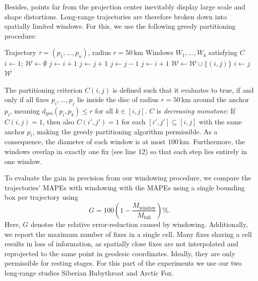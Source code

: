 Besides, points far from the projection center inevitably display large scale and shape distortions.
Long-range trajectories are therefore broken down into spatially limited windows.
For this, we use the following greedy partitioning procedure:
\begin{algorithm}[H]
\caption{Greedy-Partitioning with disc criterium}
\begin{algorithmic}[1]
\Require Trajectory $\tau = (p_1,\dots,p_n)$, radius $r = 50\,\mathrm{km}$
\Ensure Windows $W_1,\dots,W_k$ satisfying $C$ 
\State $i \gets 1$; \; $\mathcal{W} \gets \emptyset$
  \State $j \gets i + 1$
    \State $j \gets j + 1$
  \EndWhile
  \State $j \gets j - 1$
    \State $j \gets i + 1$
  \EndIf
  \State $\mathcal{W} \gets \mathcal{W} \cup \{(i,j)\}$
  \State $i \gets j$
\EndWhile
\State \Return $\mathcal{W}$
\end{algorithmic}
\label{alg:windowing-algorithm}
\end{algorithm}
The partitioning criterion $C(i, j)$ is defined such that it evaluates to true, 
if and only if all fixes $p_i,\dots,p_j$ lie inside the disc of radius $r=50\,\mathrm{km}$ around the anchor $p_i$,
meaning $d_{\mathrm{geo}}(p_i, p_k) \le r$ for all $k \in [i,j]$. $C$ is \emph{decreasing monotone}: 
If $C(i,j)=1$, then also $C(i',j')=1$ for each $[i',j'] \subseteq [i,j]$ with the same anchor $p_i$, 
making the greedy partitioning algorithm permissible.
As a consequence, the diameter of each window is at most $100 \,\mathrm{km}$.
Furthermore, the windows overlap in exactly one fix (see line 12) so that each step lies entirely in one window.

To evaluate the gain in precision from our windowing procedure, we compare the trajectories' MAPEs with windowing with the MAPEs using a single bounding box per trajectory using 
\[
G = 100 \left(1-\frac{M_{\mathrm{window}}}{M_{\mathrm{full}}}\right)\%.
\]
Here, $G$ denotes the relative error-reduction caused by windowing. 
Additionally, we report the maximum number of fixes in a single cell. Many fixes sharing a cell results in loss of information, as spatially close fixes are not interpolated and reprojected to the same point in geodesic coordinates. 
Ideally, they are only permissible for resting stages.
For this part of the experiments we use our two long-range studies Siberian Rubythroat and Arctic Fox.



